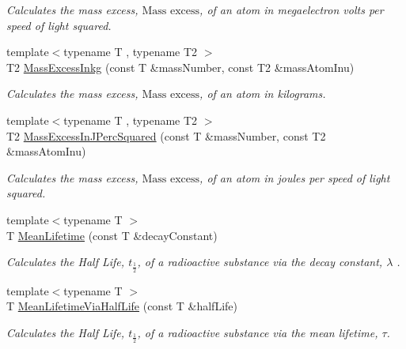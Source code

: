 \begin{DoxyCompactItemize}
\begin{DoxyCompactList}\small\item\em Calculates the mass excess, $\text{Mass excess}$, of an atom in megaelectron volts per speed of light squared. \end{DoxyCompactList}\item 
{\footnotesize template$<$typename T , typename T2 $>$ }\\T2 \mbox{\hyperlink{group___e_g_x_phys-_mass_excess_gab72a3640886092be8b9c9662020a2306}{Mass\+Excess\+Inkg}} (const T \&mass\+Number, const T2 \&mass\+Atom\+Inu)
\begin{DoxyCompactList}\small\item\em Calculates the mass excess, $\text{Mass excess}$, of an atom in kilograms. \end{DoxyCompactList}\item 
{\footnotesize template$<$typename T , typename T2 $>$ }\\T2 \mbox{\hyperlink{group___e_g_x_phys-_mass_excess_ga3eb487f438543e950b9c5aece4c5b409}{Mass\+Excess\+In\+J\+Perc\+Squared}} (const T \&mass\+Number, const T2 \&mass\+Atom\+Inu)
\begin{DoxyCompactList}\small\item\em Calculates the mass excess, $\text{Mass excess}$, of an atom in joules per speed of light squared. \end{DoxyCompactList}\item 
{\footnotesize template$<$typename T $>$ }\\T \mbox{\hyperlink{group___e_g_x_phys-_mean_lifetime_gaa9e3c2deedda4bc7a745568b06fc47eb}{Mean\+Lifetime}} (const T \&decay\+Constant)
\begin{DoxyCompactList}\small\item\em Calculates the Half Life, $t_{\frac{1}{2}}$, of a radioactive substance via the decay constant, $\lambda$ . \end{DoxyCompactList}\item 
{\footnotesize template$<$typename T $>$ }\\T \mbox{\hyperlink{group___e_g_x_phys-_mean_lifetime_ga2586e148263e1f6c8ff89f269a0930ea}{Mean\+Lifetime\+Via\+Half\+Life}} (const T \&half\+Life)
\begin{DoxyCompactList}\small\item\em Calculates the Half Life, $t_{\frac{1}{2}}$, of a radioactive substance via the mean lifetime, $\tau$. \end{DoxyCompactList}\item 

\end{DoxyCompactItemize}
